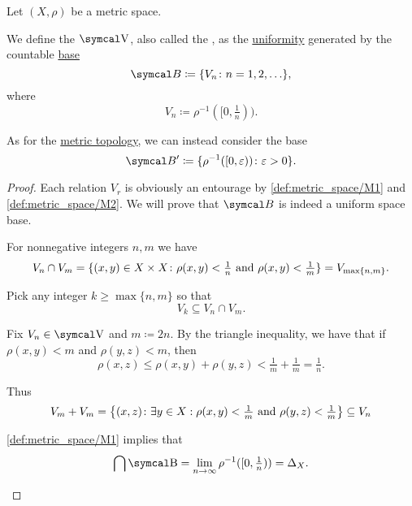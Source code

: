 \begin{Definition}\label{def:metric_uniformity}
  Let \( (X, \rho) \) be a metric space.

  We define the  \( \CV \), also called the , as the \hyperref[def:uniform_space]{uniformity} generated by the countable \hyperref[thm:uniform_space_base_axioms]{base}
  \begin{equation}\label{def:metric_uniformity/integer_base}
    \Cal{B} \coloneqq \{ V_n \colon n = 1, 2, \ldots \},
  \end{equation}
  where
  \begin{equation*}
    V_n \coloneqq \rho^{-1}([0, \tfrac 1 n)).
  \end{equation*}

  As for the \hyperref[def:metric_topology]{metric topology}, we can instead consider the base
  \begin{equation}\label{def:metric_uniformity/real_base}
    \Cal{B}' \coloneqq \{ \rho^{-1}([0, \varepsilon)) \colon \varepsilon > 0 \}.
  \end{equation}
\end{Definition}
\begin{proof}
  Each relation \( V_r \) is obviously an entourage by \ref{def:metric_space/M1} and \ref{def:metric_space/M2}. We will prove that \( \Cal{B} \) is indeed a uniform space base.

  \begin{RefList}
     For nonnegative integers \( n, m \) we have
    \begin{equation*}
      V_n \cap V_m
      =
      \{ (x, y) \in X \times X \colon \rho(x, y) < \tfrac 1 n \text{ and } \rho(x, y) < \tfrac 1 m \}
      =
      V_{\max\{ n, m \}}.
    \end{equation*}

    Pick any integer \( k \geq \max\{ n, m \} \) so that
    \begin{equation*}
      V_k \subseteq V_n \cap V_m.
    \end{equation*}

     Fix \( V_n \in \CV \) and \( m \coloneqq 2n \). By the triangle inequality, we have that if \( \rho(x, y) < m \) and \( \rho(y, z) < m \), then
    \begin{equation*}
       \rho(x, z) \leq \rho(x, y) + \rho(y, z) < \tfrac 1 m + \tfrac 1 m = \tfrac 1 n.
    \end{equation*}

    Thus
    \begin{equation*}
      V_m + V_m
      =
      \left\{ (x, z) \colon \exists y \in X: \rho(x, y) < \tfrac 1 m \text{ and } \rho(y, z) < \tfrac 1 m \right\}
      \subseteq
      V_n
    \end{equation*}

     \ref{def:metric_space/M1} implies that
    \begin{equation*}
      \bigcap \CB = \lim_{n \to \infty} \rho^{-1}([0, \tfrac 1 n)) = \Delta_X.
    \end{equation*}
  \end{RefList}
\end{proof}

